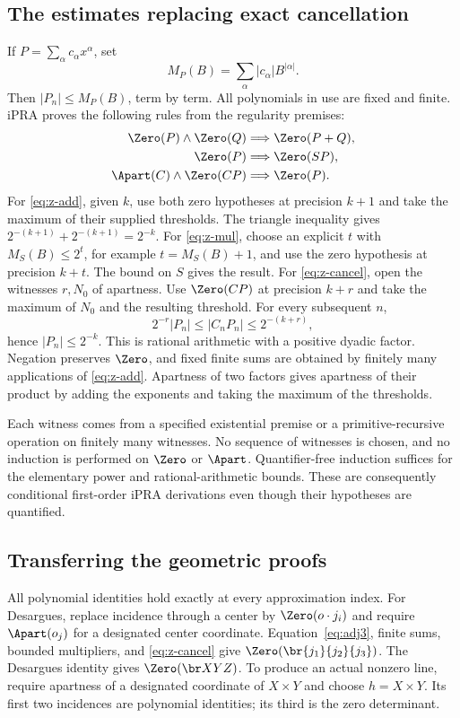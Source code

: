\subsection{The estimates replacing exact cancellation}
If $P=\sum_\alpha c_\alpha x^\alpha$, set
\[
 M_P(B)=\sum_\alpha |c_\alpha|B^{|\alpha|}.
\]
Then $|P_n|\le M_P(B)$, term by term. All polynomials in use are fixed
and finite. iPRA proves the following rules from the regularity premises:
\begin{align}
 \Zero(P)\land\Zero(Q)&\Longrightarrow\Zero(P+Q),\label{eq:z-add}\\
 \Zero(P)&\Longrightarrow\Zero(SP),\label{eq:z-mul}\\
 \Apart(C)\land\Zero(CP)&\Longrightarrow\Zero(P).\label{eq:z-cancel}
\end{align}
For \eqref{eq:z-add}, given $k$, use both zero hypotheses at precision
$k+1$ and take the maximum of their supplied thresholds. The triangle
inequality gives $2^{-(k+1)}+2^{-(k+1)}=2^{-k}$.
For \eqref{eq:z-mul}, choose an explicit $t$ with $M_S(B)\le2^t$,
for example $t=M_S(B)+1$, and use the zero hypothesis at precision
$k+t$. The bound on $S$ gives the result.
For \eqref{eq:z-cancel}, open the witnesses $r,N_0$ of apartness.
Use $\Zero(CP)$ at precision $k+r$ and take the maximum of $N_0$ and
the resulting threshold. For every subsequent $n$,
\[
 2^{-r}|P_n|\le|C_nP_n|\le2^{-(k+r)},
\]
hence $|P_n|\le2^{-k}$. This is rational arithmetic with a positive dyadic
factor. Negation preserves $\Zero$, and fixed finite sums are obtained
by finitely many applications of \eqref{eq:z-add}. Apartness of two
factors gives apartness of their product by adding the exponents and
taking the maximum of the thresholds.

Each witness comes from a specified existential premise or a
primitive-recursive operation on finitely many witnesses. No sequence
of witnesses is chosen, and no induction is performed on $\Zero$ or
$\Apart$. Quantifier-free induction suffices for the elementary power
and rational-arithmetic bounds. These are consequently conditional
first-order iPRA derivations even though their hypotheses are quantified.

\subsection{Transferring the geometric proofs}
All polynomial identities hold exactly at every approximation index.
For Desargues, replace incidence through a center by
$\Zero(o\cdot j_i)$ and require $\Apart(o_j)$ for a designated center
coordinate. Equation~\eqref{eq:adj3}, finite sums, bounded multipliers,
and \eqref{eq:z-cancel} give $\Zero(\br{j_1}{j_2}{j_3})$.
The Desargues identity gives $\Zero(\br X Y Z)$.
To produce an actual nonzero line, require apartness of a designated
coordinate of $X\times Y$ and choose $h=X\times Y$. Its first two
incidences are polynomial identities; its third is the zero determinant.

